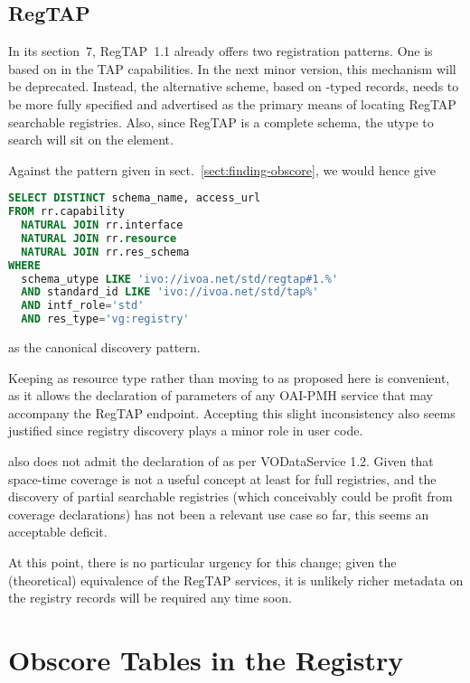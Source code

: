 \documentclass[11pt,a4paper]{ivoa}
\begin{document}
\subsection{RegTAP}

In its section~7, RegTAP~1.1 \citep{2019ivoa.spec.1011D} already offers
two registration patterns.  One is based on  in the TAP
capabilities.  In the next minor version, this mechanism will be
deprecated.  Instead, the alternative scheme, based on
-typed records, needs to be more fully specified and
advertised as the primary means of locating RegTAP searchable
registries.   Also, since RegTAP is a complete schema, the utype to
search will sit on the  element.

Against the pattern given in sect.~\ref{sect:finding-obscore}, we would hence
give
\begin{lstlisting}[language=SQL]
SELECT DISTINCT schema_name, access_url
FROM rr.capability
  NATURAL JOIN rr.interface
  NATURAL JOIN rr.resource
  NATURAL JOIN rr.res_schema
WHERE
  schema_utype LIKE 'ivo://ivoa.net/std/regtap#1.%'
  AND standard_id LIKE 'ivo://ivoa.net/std/tap%'
  AND intf_role='std'
  AND res_type='vg:registry'
\end{lstlisting}
as the canonical discovery pattern.

Keeping  as resource type rather than moving to
 as proposed here is convenient, as it allows
the declaration of parameters of any OAI-PMH service that may accompany
the RegTAP endpoint.  Accepting this slight inconsistency also seems
justified since registry discovery plays a minor role in user code.

 also does not admit the declaration of
 as per VODataService 1.2.  Given that
space-time coverage is not a useful concept at least for full
registries, and the discovery of partial searchable registries (which
conceivably could be profit from coverage declarations)
has not been a relevant use case so
far, this seems an acceptable deficit.

At this point, there is no particular urgency for this change;
given the (theoretical) equivalence of the RegTAP
services, it is unlikely richer metadata on the registry records will be
required any time soon.


\section{Obscore Tables in the Registry}
\label{sect:obscore}
\end{document}
